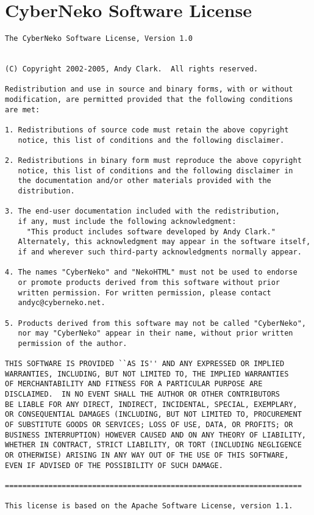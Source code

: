 \documentclass{InsightBook}
\begin{document}
\section{CyberNeko Software License}

\begin{verbatim}
The CyberNeko Software License, Version 1.0

 
(C) Copyright 2002-2005, Andy Clark.  All rights reserved.
 
Redistribution and use in source and binary forms, with or without
modification, are permitted provided that the following conditions
are met:

1. Redistributions of source code must retain the above copyright
   notice, this list of conditions and the following disclaimer. 

2. Redistributions in binary form must reproduce the above copyright
   notice, this list of conditions and the following disclaimer in
   the documentation and/or other materials provided with the
   distribution.

3. The end-user documentation included with the redistribution,
   if any, must include the following acknowledgment:  
     "This product includes software developed by Andy Clark."
   Alternately, this acknowledgment may appear in the software itself,
   if and wherever such third-party acknowledgments normally appear.

4. The names "CyberNeko" and "NekoHTML" must not be used to endorse
   or promote products derived from this software without prior 
   written permission. For written permission, please contact 
   andyc@cyberneko.net.

5. Products derived from this software may not be called "CyberNeko",
   nor may "CyberNeko" appear in their name, without prior written
   permission of the author.

THIS SOFTWARE IS PROVIDED ``AS IS'' AND ANY EXPRESSED OR IMPLIED
WARRANTIES, INCLUDING, BUT NOT LIMITED TO, THE IMPLIED WARRANTIES
OF MERCHANTABILITY AND FITNESS FOR A PARTICULAR PURPOSE ARE
DISCLAIMED.  IN NO EVENT SHALL THE AUTHOR OR OTHER CONTRIBUTORS
BE LIABLE FOR ANY DIRECT, INDIRECT, INCIDENTAL, SPECIAL, EXEMPLARY, 
OR CONSEQUENTIAL DAMAGES (INCLUDING, BUT NOT LIMITED TO, PROCUREMENT 
OF SUBSTITUTE GOODS OR SERVICES; LOSS OF USE, DATA, OR PROFITS; OR 
BUSINESS INTERRUPTION) HOWEVER CAUSED AND ON ANY THEORY OF LIABILITY, 
WHETHER IN CONTRACT, STRICT LIABILITY, OR TORT (INCLUDING NEGLIGENCE 
OR OTHERWISE) ARISING IN ANY WAY OUT OF THE USE OF THIS SOFTWARE, 
EVEN IF ADVISED OF THE POSSIBILITY OF SUCH DAMAGE.

====================================================================

This license is based on the Apache Software License, version 1.1.
\end{verbatim}
\end{document}
